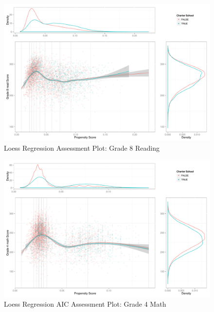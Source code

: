 \documentclass[letterpaper,12p,twoside]{article} %
\begin{document}
\begin{figure}[h!]
\begin{center}
\includegraphics[height=.4\textheight]{../Figures2009/g8read-loess.pdf}
\caption{Loess Regression Assessment Plot: Grade 8 Reading}
\label{fig:g8read:loess}
\end{center}
\end{figure}

\begin{figure}[h!]
\begin{center}
\includegraphics[height=.4\textheight]{../Figures2009/g4math-loessAIC.pdf}
\caption{Loess Regression AIC Assessment Plot: Grade 4 Math}
\label{fig:g4math:loessAIC}
\end{center}
\end{figure}
\end{document}

